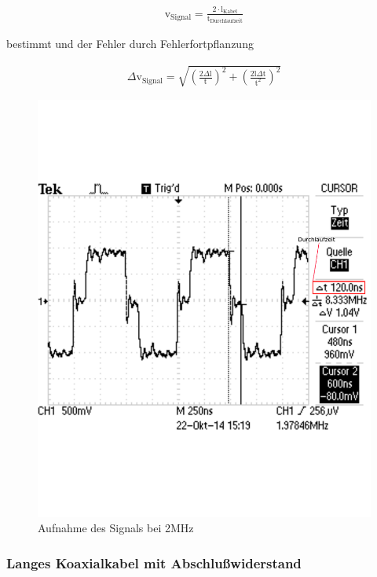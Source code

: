 \documentclass[12pt,a4paper]{article}
\begin{document}
\begin{align}
\text{v}_\text{Signal} = \frac{2 \cdot \text{l}_\text{Kabel}}{\text{t}_\text{Durchlaufzeit}}
\end{align}

bestimmt und der Fehler durch Fehlerfortpflanzung

\begin{align}
\Delta \text{v}_\text{Signal} = \sqrt{\left( \frac{2 \Delta \text{l}}{\text{t}} \right)^2 + \left( \frac{2 \text{l} \Delta \text{t}}{\text{t}^2} \right)^2}
\end{align}

\begin{figure}[H] 
  \centering
    \includegraphics[scale = 0.5]{3_2.pdf}
  	\caption[Aufnahme des Signals bei 2MHz]{Aufnahme des Signals bei 2MHz}
  \label{fig:3_2}
\end{figure}

\subsubsection{Langes Koaxialkabel mit Abschlußwiderstand}
\end{document}
